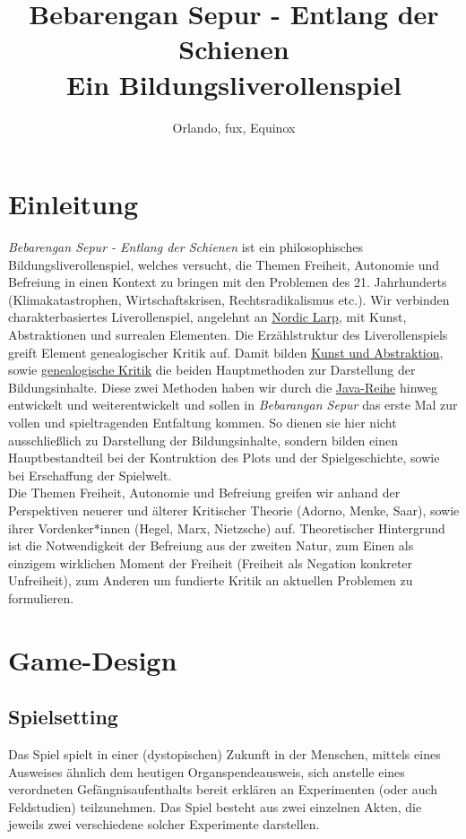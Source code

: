 \documentclass[12pt, a4paper, openany]{report}
\title{
    {Bebarengan Sepur - Entlang der Schienen}\\
    {\large{Ein Bildungsliverollenspiel}}\\
}
\author{Orlando, fux, Equinox}
\begin{document}
\maketitle
\frontmatter
\tableofcontents
\mainmatter

\chapter{Einleitung}
\textit{Bebarengan Sepur - Entlang der Schienen} ist ein philosophisches Bildungsliverollenspiel, welches versucht, die Themen Freiheit, Autonomie und Befreiung in einen Kontext zu bringen mit den Problemen des 21. Jahrhunderts (Klimakatastrophen, Wirtschaftskrisen, Rechtsradikalismus etc.). 
Wir verbinden charakterbasiertes Liverollenspiel, angelehnt an \hyperref[nordic-larp]{Nordic Larp}, mit Kunst, Abstraktionen und surrealen Elementen. 
Die Erzählstruktur des Liverollenspiels greift Element genealogischer Kritik auf. 
Damit bilden \hyperref[kunst-abstraktion]{Kunst und Abstraktion}, sowie \hyperref[genealogische-kritik]{genealogische Kritik} die beiden Hauptmethoden zur Darstellung der Bildungsinhalte. 
Diese zwei Methoden haben wir durch die \hyperref[java-reihe]{Java-Reihe} hinweg entwickelt und weiterentwickelt und sollen in \textit{Bebarangan Sepur} das erste Mal zur vollen und spieltragenden Entfaltung kommen. 
So dienen sie hier nicht ausschließlich zu Darstellung der Bildungsinhalte, sondern bilden einen Hauptbestandteil bei der Kontruktion des Plots und der Spielgeschichte, sowie bei Erschaffung der Spielwelt.\\
Die Themen Freiheit, Autonomie und Befreiung greifen wir anhand der Perspektiven neuerer und älterer Kritischer Theorie (Adorno, Menke, Saar), sowie ihrer Vordenker*innen (Hegel, Marx, Nietzsche) auf. 
Theoretischer Hintergrund ist die Notwendigkeit der Befreiung aus der zweiten Natur, zum Einen als einzigem wirklichen Moment der Freiheit (Freiheit als Negation konkreter Unfreiheit), zum Anderen um fundierte Kritik an aktuellen Problemen zu formulieren.

\chapter{Game-Design}
\section{Spielsetting}
Das Spiel spielt in einer (dystopischen) Zukunft in der Menschen, mittels eines Ausweises \"ahnlich dem heutigen Organspendeausweis, sich anstelle eines verordneten Gefängnisaufenthalts bereit erkl\"aren an Experimenten (oder auch \glqq Feldstudien\grqq) teilzunehmen. 
Das Spiel besteht aus zwei einzelnen \glqq Akten\grqq, die jeweils zwei verschiedene solcher Experimente darstellen.
\end{document}
